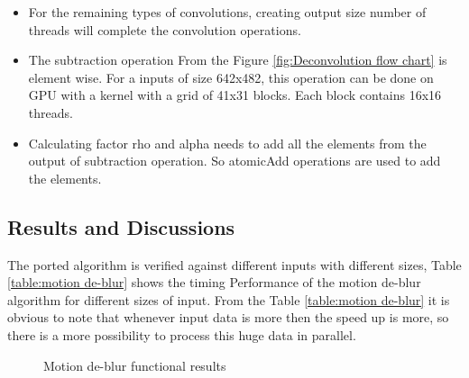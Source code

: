 \begin{itemize}
\begin{figure}[h!]
		\label{fig:convolution kernel}
	\end{figure}
	\item For the remaining types of convolutions, creating output size number of threads will complete the convolution operations.
	\item The subtraction operation From the Figure \ref{fig:Deconvolution flow chart} is element wise. For a inputs of size 642x482, this operation can be done on GPU with a kernel with a grid of 41x31 blocks. Each block contains 16x16 threads.
	\item Calculating factor rho and alpha needs to add all the elements from the output of subtraction operation. So atomicAdd operations are used to add the elements.
\end{itemize}

\subsection{Results and Discussions}
The ported algorithm is verified against different inputs with different sizes, Table \ref{table:motion de-blur} shows the timing Performance of the motion de-blur algorithm for different sizes of input. From the Table \ref{table:motion de-blur} it is obvious to note that whenever input data is more then the speed up is more, so there is a more possibility to process this huge data in parallel.
\begin{table}[htb]
	\centering
		\caption{timing performance of motion de-blur algorithm}
		\label{table:motion de-blur}
	\end{table}
\begin{figure}[htb]
	{\centering
	\qquad
	\caption{Motion de-blur functional results}%
	\label{fig:motion de-blur results}%
}
\end{figure}
